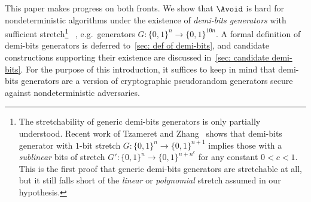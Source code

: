 This paper makes progress on both fronts. We show that $\Avoid$ is hard for nondeterministic algorithms under the existence of \emph{demi-bits generators} with sufficient stretch\footnote{The stretchability of generic demi-bits generators is only partially understood. Recent work of Tzameret and Zhang~\cite{tzameret_et_al:LIPIcs.ITCS.2024.95} shows that demi-bits generator with $1$-bit stretch $G : \{0, 1\}^n \to \{0, 1\}^{n+1}$ implies those with a \emph{sublinear} bits of stretch $G': \{0, 1\}^n \to \{0, 1\}^{n + n^c}$ for any constant $0 < c < 1$. This is the first proof that generic demi-bits generators are stretchable at all, but it still falls short of the \emph{linear} or \emph{polynomial} stretch assumed in our hypothesis.}%
~\cite{Rudich97}, e.g.\ generators $G : \{0,1\}^n \to \{0,1\}^{10n}$. A formal definition of demi-bits generators is deferred to~\autoref{sec: def of demi-bits}, and candidate constructions supporting their existence are discussed in~\autoref{sec: candidate demi-bits}. For the purpose of this introduction, it suffices to keep in mind that demi-bits generators are a version of cryptographic pseudorandom generators secure against nondeterministic adversaries. 




